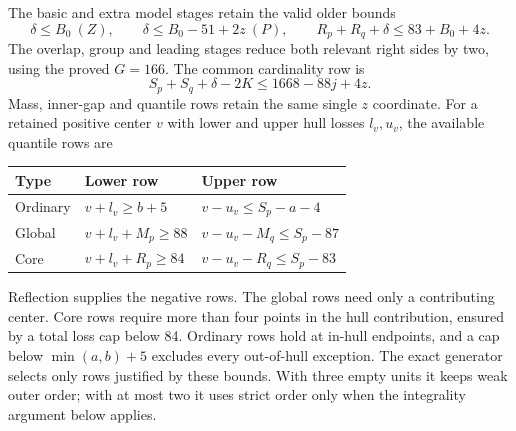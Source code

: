 \documentclass[11pt,a4paper]{article}
\theoremstyle{remark}
\begin{document}
The basic and extra model stages retain the valid older bounds
\[
 \delta\le B_0\ (Z),\qquad
 \delta\le B_0-51+2z\ (P),\qquad
 R_p+R_q+\delta\le83+B_0+4z.
\]
The overlap, group and leading stages reduce both relevant right sides
by two, using the proved $G=166$. The common cardinality row is
\[
 S_p+S_q+\delta-2K\le1668-88j+4z.
\]
Mass, inner-gap and quantile rows retain the same single $z$ coordinate.
For a retained positive center $v$ with lower and upper hull losses
$l_v,u_v$, the available quantile rows are
\begin{center}\small
\begin{tabular}{lll}
\toprule
Type&Lower row&Upper row\\\midrule
Ordinary&$v+l_v\ge b+5$&$v-u_v\le S_p-a-4$\\
Global&$v+l_v+M_p\ge88$&$v-u_v-M_q\le S_p-87$\\
Core&$v+l_v+R_p\ge84$&$v-u_v-R_q\le S_p-83$\\\bottomrule
\end{tabular}
\end{center}
Reflection supplies the negative rows. The global rows need only a
contributing center. Core rows require more than four points in the
hull contribution, ensured by a total loss cap below 84. Ordinary rows
hold at in-hull endpoints, and a cap below $\min(a,b)+5$ excludes every
out-of-hull exception. The exact generator selects only rows justified
by these bounds. With three empty units it keeps weak outer order;
with at most two it uses strict order only when the integrality argument
below applies.
\end{document}
